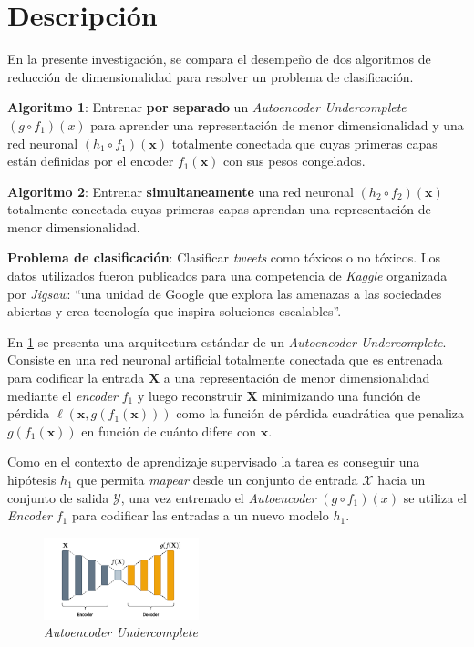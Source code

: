 \section*{Descripción}

En la presente investigación, se compara el desempeño de dos algoritmos de reducción de dimensionalidad para resolver un problema de clasificación.

\textbf{Algoritmo 1}: Entrenar \textbf{por separado} un \textit{Autoencoder Undercomplete} $(g \circ f_1)(x)$ para aprender una representación de menor dimensionalidad y una red neuronal $(h_1 \circ f_1)(\bm{x})$ totalmente conectada que cuyas primeras capas están definidas por el encoder $f_1(\bm{x})$ con sus pesos congelados.

\textbf{Algoritmo 2}: Entrenar \textbf{simultaneamente} una red neuronal $(h_2 \circ f_2)(\bm{x})$ totalmente conectada cuyas primeras capas aprendan una representación de menor dimensionalidad.

\textbf{Problema de clasificación}: Clasificar \textit{tweets} como tóxicos o no tóxicos. Los datos utilizados fueron publicados para una competencia de \textit{Kaggle} \cite{jigsaw-toxic-comment-classification-challenge} organizada por \textit{Jigsaw}: ``una unidad de Google que explora las amenazas a las sociedades abiertas y crea tecnología que inspira soluciones escalables''.

En \ref{fig:autoencoder} se presenta una arquitectura estándar de un \textit{Autoencoder Undercomplete}. Consiste en una red neuronal artificial totalmente conectada que es entrenada para codificar la entrada $\mathbf{X}$ a una representación de menor dimensionalidad mediante el \textit{encoder} $f_1$ y luego reconstruir $\mathbf{X}$ minimizando una función de pérdida $\ell(\bm{x},g(f_1(\bm{x})))$ como la función de pérdida cuadrática que penaliza $g(f_1(\bm{x}))$ en función de cuánto difere con $\bm{x}$.

Como en el contexto de aprendizaje supervisado la tarea es conseguir una hipótesis $h_1$ que permita \textit{mapear} desde un conjunto de entrada $\mathcal{X}$ hacia un conjunto de salida $\mathcal{Y}$, una vez entrenado el \textit{Autoencoder} $(g \circ f_1)(x)$ se utiliza el \textit{Encoder} $f_1$ para codificar las entradas a un nuevo modelo $h_{1}$. 

\begin{figure}[h]
\centering
\includegraphics[width=0.4\textwidth]{autoencoder}
\caption{\label{fig:autoencoder} \textit{Autoencoder Undercomplete}}
\end{figure}


